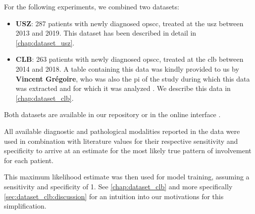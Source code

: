 \begin{tcolorbox}[title=\faIcon{database} Data, parbox=false]
    For the following experiments, we combined two datasets:

    \begin{itemize}[leftmargin=7mm]
        \item[\faIcon{hospital}] \textbf{USZ}: 287 patients with newly diagnosed \gls{opscc}, treated at the \acrlong{usz} between 2013 and 2019. This dataset has been described in detail in \cref{chap:dataset_usz}.
        \item[\faIcon{hospital}] \textbf{CLB}: 263 patients with newly diagnosed \gls{opscc}, treated at the \acrlong{clb} between 2014 and 2018. A table containing this data was kindly provided to us by \textbf{Vincent Grégoire}, who was also the \gls{pi} of the study during which this data was extracted and for which it was analyzed \cite{bauwens_prevalence_2021}. We describe this data in \cref{chap:dataset_clb}.
    \end{itemize}

    Both datasets are available in our repository  or in the online interface .

    All available diagnostic and pathological modalities reported in the data were used in combination with literature values for their respective sensitivity and specificity \cite{de_bondt_detection_2007,kyzas_18f-fluorodeoxyglucose_2008} to arrive at an estimate for the most likely true pattern of involvement for each patient.

    This maximum likelihood estimate was then used for model training, assuming a sensitivity and specificity of 1. See \cref{chap:dataset_clb} and more specifically \cref{sec:dataset_clb:discussion} for an intuition into our motivations for this simplification.
\end{tcolorbox}
